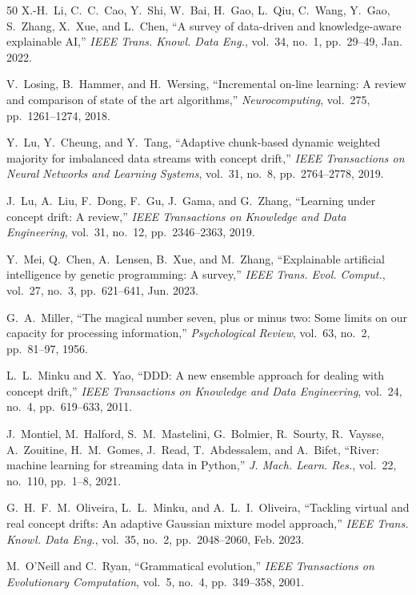 \documentclass[lettersize,journal]{IEEEtran}
\begin{document}
\begin{thebibliography}{50}
X.-H.~Li, C.~C.~Cao, Y.~Shi, W.~Bai, H.~Gao, L.~Qiu, C.~Wang, Y.~Gao, S.~Zhang, X.~Xue, and L.~Chen, ``A survey of data-driven and knowledge-aware explainable {AI},'' \textit{IEEE Trans. Knowl. Data Eng.}, vol.~34, no.~1, pp.~29--49, Jan. 2022.

V.~Losing, B.~Hammer, and H.~Wersing, ``Incremental on-line learning: A review and comparison of state of the art algorithms,'' \textit{Neurocomputing}, vol.~275, pp.~1261--1274, 2018.

Y.~Lu, Y.~Cheung, and Y.~Tang, ``Adaptive chunk-based dynamic weighted majority for imbalanced data streams with concept drift,'' \textit{IEEE Transactions on Neural Networks and Learning Systems}, vol.~31, no.~8, pp.~2764--2778, 2019.

J.~Lu, A.~Liu, F.~Dong, F.~Gu, J.~Gama, and G.~Zhang, ``Learning under concept drift: A review,'' \textit{IEEE Transactions on Knowledge and Data Engineering}, vol.~31, no.~12, pp.~2346--2363, 2019.

Y.~Mei, Q.~Chen, A.~Lensen, B.~Xue, and M.~Zhang, ``Explainable artificial intelligence by genetic programming: A survey,'' \textit{IEEE Trans. Evol. Comput.}, vol.~27, no.~3, pp.~621--641, Jun. 2023.

G.~A.~Miller, ``The magical number seven, plus or minus two: Some limits on our capacity for processing information,'' \textit{Psychological Review}, vol.~63, no.~2, pp.~81--97, 1956.

L.~L.~Minku and X.~Yao, ``DDD: A new ensemble approach for dealing with concept drift,'' \textit{IEEE Transactions on Knowledge and Data Engineering}, vol.~24, no.~4, pp.~619--633, 2011.

J.~Montiel, M.~Halford, S.~M.~Mastelini, G.~Bolmier, R.~Sourty, R.~Vaysse, A.~Zouitine, H.~M.~Gomes, J.~Read, T.~Abdessalem, and A.~Bifet, ``River: machine learning for streaming data in {P}ython,'' \textit{J. Mach. Learn. Res.}, vol.~22, no.~110, pp.~1--8, 2021.

G.~H.~F.~M.~Oliveira, L.~L.~Minku, and A.~L.~I.~Oliveira, ``Tackling virtual and real concept drifts: An adaptive {G}aussian mixture model approach,'' \textit{IEEE Trans. Knowl. Data Eng.}, vol.~35, no.~2, pp.~2048--2060, Feb. 2023.

M.~O'Neill and C.~Ryan, ``Grammatical evolution,'' \textit{IEEE Transactions on Evolutionary Computation}, vol.~5, no.~4, pp.~349--358, 2001.


\end{thebibliography}
\end{document}
